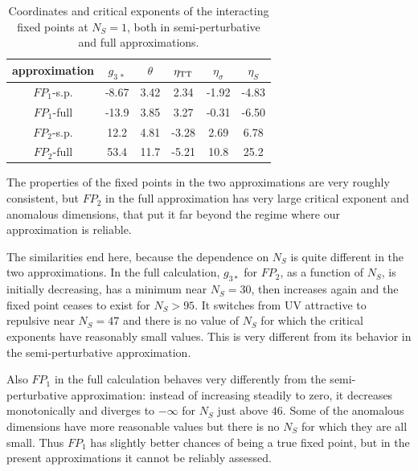 \documentclass[twocolumn,prd,superscriptaddress,preprintnumbers,amsmath,amssymb,nofootinbib]{revtex4}
\begin{document}
\begin{table}[!here]
\begin{tabular}{cccccc}
approximation&$g_{3\,\ast}$& $\theta$& $\eta_{\rm TT}$&$\eta_{\sigma}$& $\eta_S$\\ \hline \hline
$FP_1$-s.p. & -8.67 & 3.42 & 2.34 &-1.92 &-4.83 \\ \hline
$FP_1$-full & -13.9 & 3.85 & 3.27 &-0.31 &-6.50 \\ \hline
$FP_2$-s.p. & 12.2 & 4.81 & -3.28 & 2.69 & 6.78 \\ \hline
$FP_2$-full & 53.4 & 11.7 & -5.21 &10.8 &25.2\\ \hline\hline
\end{tabular}
\caption{\label{FPtab3}Coordinates and critical exponents of the interacting fixed points at $N_S=1$, both in semi-perturbative and full approximations.}
\end{table} 


The properties of the fixed points in the two approximations
are very roughly consistent, but $FP_2$ in the full approximation
has very large critical exponent and anomalous dimensions,
that put it far beyond the regime where our approximation is reliable.


The similarities end here, because the dependence on $N_S$
is quite different in the two approximations.
In the full calculation, $g_{3*}$ for $FP_2$,
as a function of $N_S$, is initially decreasing, 
has a minimum near $N_S=30$,
then increases again and the fixed point 
ceases to exist for $N_S>95$.
It switches from UV attractive to repulsive near $N_S=47$
and there is no value of $N_S$ for which the critical exponents
have reasonably small values.
This is very different from its behavior in the semi-perturbative
approximation.

Also $FP_1$ in the full calculation behaves very differently from
the semi-perturbative approximation:
instead of increasing steadily to zero, it decreases monotonically
and diverges to $-\infty$ for $N_S$ just above $46$.
Some of the anomalous dimensions have more reasonable values
but there is no $N_S$ for which they are all small.
Thus $FP_1$ has slightly better chances of being
a true fixed point, but in the present approximations
it cannot be reliably assessed.
\end{document}
